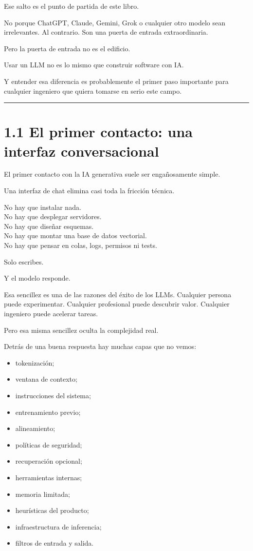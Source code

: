 Ese salto es el punto de partida de este libro.

No porque ChatGPT, Claude, Gemini, Grok o cualquier otro modelo sean
irrelevantes. Al contrario. Son una puerta de entrada extraordinaria.

Pero la puerta de entrada no es el edificio.

Usar un LLM no es lo mismo que construir software con IA.

Y entender esa diferencia es probablemente el primer paso importante
para cualquier ingeniero que quiera tomarse en serio este campo.

\begin{center}\rule{0.5\linewidth}{0.5pt}\end{center}

\section{1.1 El primer contacto: una interfaz
conversacional}\label{el-primer-contacto-una-interfaz-conversacional}

El primer contacto con la IA generativa suele ser engañosamente simple.

Una interfaz de chat elimina casi toda la fricción técnica.

No hay que instalar nada.\\
No hay que desplegar servidores.\\
No hay que diseñar esquemas.\\
No hay que montar una base de datos vectorial.\\
No hay que pensar en colas, logs, permisos ni tests.

Solo escribes.

Y el modelo responde.

Esa sencillez es una de las razones del éxito de los LLMs. Cualquier
persona puede experimentar. Cualquier profesional puede descubrir valor.
Cualquier ingeniero puede acelerar tareas.

Pero esa misma sencillez oculta la complejidad real.

Detrás de una buena respuesta hay muchas capas que no vemos:

\begin{itemize}
\tightlist
\item
  tokenización;
\item
  ventana de contexto;
\item
  instrucciones del sistema;
\item
  entrenamiento previo;
\item
  alineamiento;
\item
  políticas de seguridad;
\item
  recuperación opcional;
\item
  herramientas internas;
\item
  memoria limitada;
\item
  heurísticas del producto;
\item
  infraestructura de inferencia;
\item
  filtros de entrada y salida.
\end{itemize}

